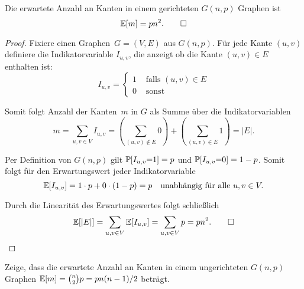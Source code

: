 \begin{lemma}\label{lemma:erwartete_kanten_in_gnp}
    Die  erwartete Anzahl an Kanten in einem gerichteten $G(n,p)$ Graphen ist \begin{equation*} \mathbb{E}\!\left[m\right] = p n^2. \qedhere \end{equation*}
\end{lemma}

\begin{proof}
    Fixiere einen Graphen~$G=(V,E)$ aus $G(n,p)$.
    Für jede Kante $(u,v)$ definiere die Indikatorvariable $I_{u,v}$, die anzeigt ob die Kante $(u,v) \in E$ enthalten ist:
    \begin{equation}
        I_{u,v} = \begin{cases}
            1 & \text{ falls } (u,v) \in E \\
            0 & \text{ sonst }
        \end{cases}
    \end{equation}

    \noindent Somit folgt Anzahl der Kanten~$m$ in $G$ als Summe über die Indikatorvariablen
    \begin{equation}
        m = \sum_{u,v \in V} I_{u,v} = \left(\sum_{(u,v) \not\in E} 0 \right) +  \left(\sum_{(u,v) \in E} 1\right) = |E|.
    \end{equation}

    \noindent Per Definition von $G(n, p)$ gilt $\mathbb{P}\!\left[I_{u,v} {=} 1\right] = p$ und $\mathbb{P}\!\left[I_{u,v} {=} 0\right] = 1-p$.
    Somit folgt für den Erwartungswert jeder Indikatorvariable
    \begin{equation}
        \mathbb{E}\!\left[I_{u,v}\right] = 1 \cdot p + 0 \cdot (1-p) = p \quad \text{unabhängig für alle } u, v \in V.
    \end{equation}

    \noindent Durch die Linearität des Erwartungswertes folgt schließlich
    \begin{equation}
        \mathbb{E}\!\left[|E|\right] = \sum_{u,v \in V} \mathbb{E}\!\left[I_{u,v}\right] = \sum_{u,v \in V} p = p n^2. \qedhere
    \end{equation}
\end{proof}

\begin{exercise}
    Zeige, dass die erwartete Anzahl an Kanten in einem ungerichteten $G(n,p)$ Graphen $\mathbb{E}\!\left[m\right] = \binom{n}{2} p = p n(n-1)/2$ beträgt.
\end{exercise}

\bigskip

